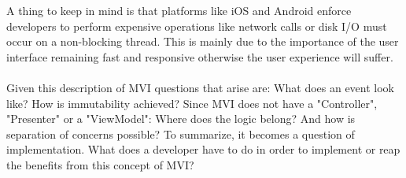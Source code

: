 A thing to keep in mind is that platforms like iOS and Android enforce developers to perform expensive operations like network calls or disk I/O
\cite{wikipediaIO}
must occur on a non-blocking thread. This is mainly due to the importance of the user interface remaining fast and responsive otherwise the user experience will suffer.
\cite{androidKeepingYourAppResponsive,androidNetworkOnMainThreadException}
\\
\\
Given this description of MVI questions that arise are: What does an event look like? How is immutability achieved?
Since MVI does not have a "Controller", "Presenter" or a "ViewModel": Where does the logic belong? And how is separation of concerns possible?
To summarize, it becomes a question of implementation. What does a developer have to do in order to implement or reap the benefits from this concept of MVI?